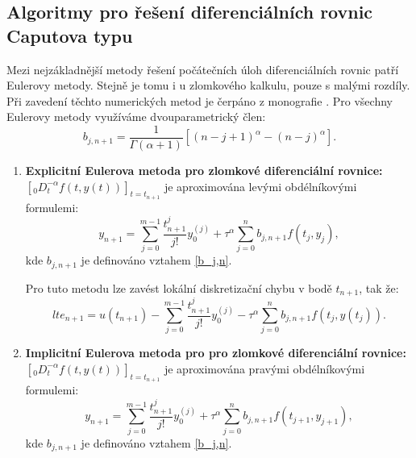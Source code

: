 \documentclass[a4paper,12pt,twoside]{article}
\theoremstyle{definition}
\theoremstyle{remark}
\numberwithin{equation}{section}
\numberwithin{table}{section}
\numberwithin{figure}{section}
\begin{document}
\subsection{Algoritmy pro řešení diferenciálních rovnic Caputova typu}

Mezi nejzákladnější metody řešení počátečních úloh diferenciálních rovnic patří Eulerovy metody. Stejně je tomu i u zlomkového kalkulu, pouze s malými rozdíly. Při zavedení těchto numerických metod je čerpáno z monografie \cite{Cangpin}.
Pro všechny Eulerovy metody využíváme dvouparametrický člen:
\begin{equation} \label{b_j,n}
	b_{j,n+1} = \frac{1}{\Gamma \left(\alpha + 1 \right)} \left[\left(n-j+1\right)^{\alpha} - \left(n-j\right)^{\alpha} \right].
\end{equation}

\begin{enumerate}[label=(\textbf{\arabic*})]
	\item \textbf{Explicitní Eulerova metoda pro zlomkové diferenciální rovnice:}
	$\left[_{0}D_{t}^{-\alpha} f\left(t,y\left(t\right)\right)\right]_{t=t_{n+1}}$ je aproximována levými obdélníkovými formulemi:
		\begin{equation} \label{C-PrimyEuler}
			y_{n+1} = \sum_{j=0}^{m-1} \frac{t_{n+1}^{j}}{j!} y_{0}^{(j)} + \tau^{\alpha} \sum_{j = 0}^{n} b_{j,n+1} f\left(t_{j}, y_{j}\right),
		\end{equation}
	kde $b_{j, n+1}$ je definováno vztahem \eqref{b_j,n}. %
	
	Pro tuto metodu lze zavést lokální diskretizační chybu v bodě $t_{n+1}$, tak že:
	\begin{equation*}
		lte_{n+1} = u\left(t_{n+1}\right) - \sum_{j=0}^{m-1} \frac{t_{n+1}^{j}}{j!} y_{0}^{(j)} - \tau^{\alpha} \sum_{j = 0}^{n} b_{j,n+1} f\left(t_{j}, y\left(t_{j}\right)\right).
	\end{equation*}
	
	\item \textbf{Implicitní Eulerova metoda pro pro zlomkové diferenciální rovnice:}
		$\left[_{0}D_{t}^{-\alpha} f\left(t,y\left(t\right)\right)\right]_{t=t_{n+1}}$ je aproximována pravými obdélníkovými formulemi:
		\begin{equation} \label{C-NeprimyEuler}
			y_{n+1} = \sum_{j=0}^{m-1} \frac{t_{n+1}^{j}}{j!} y_{0}^{(j)} + \tau^{\alpha} \sum_{j = 0}^{n} 	b_{j,n+1} f\left(t_{j+1}, y_{j+1}\right),
		\end{equation}
	kde $b_{j, n+1}$ je definováno vztahem \eqref{b_j,n}. %
	

\end{enumerate}
\end{document}
